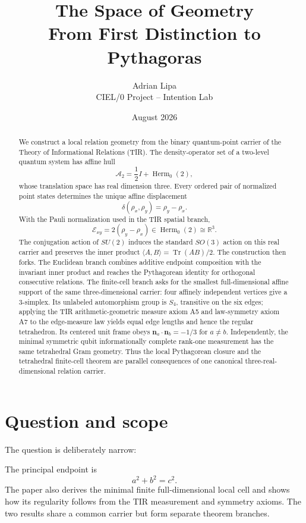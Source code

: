 \documentclass[12pt,a4paper]{article}
\title{\textbf{The Space of Geometry}\\[0.4em]\large From First Distinction to Pythagoras}
\author{Adrian Lipa\\\small CIEL/0 Project -- Intention Lab}
\date{August 2026}
\newcommand{\Herm}{\operatorname{Herm}}
\newcommand{\Tr}{\operatorname{Tr}}
\newcommand{\R}{\mathbb{R}}
\newcommand{\Erel}{\mathcal{E}}
\newcommand{\Astate}{\mathcal{A}_2}
\newcommand{\nvec}{\bm{n}}
\begin{document}
\maketitle

\begin{abstract}
We construct a local relation geometry from the binary quantum-point carrier of the Theory of Informational Relations (TIR). The density-operator set of a two-level quantum system has affine hull
\[
\Astate=\frac12 I+\Herm_0(2),
\]
whose translation space has real dimension three. Every ordered pair of normalized point states determines the unique affine displacement
\[
\delta(\rho_x,\rho_y)=\rho_y-\rho_x.
\]
With the Pauli normalization used in the TIR spatial branch,
\[
\Erel_{xy}=2(\rho_y-\rho_x)\in\Herm_0(2)\cong\R^3.
\]
The conjugation action of $SU(2)$ induces the standard $SO(3)$ action on this real carrier and preserves the inner product $\langle A,B\rangle=\Tr(AB)/2$. The construction then forks. The Euclidean branch combines additive endpoint composition with the invariant inner product and reaches the Pythagorean identity for orthogonal consecutive relations. The finite-cell branch asks for the smallest full-dimensional affine support of the same three-dimensional carrier: four affinely independent vertices give a $3$-simplex. Its unlabeled automorphism group is $S_4$, transitive on the six edges; applying the TIR arithmetic-geometric measure axiom A5 and law-symmetry axiom A7 to the edge-measure law yields equal edge lengths and hence the regular tetrahedron. Its centered unit frame obeys $\nvec_a\cdot\nvec_b=-1/3$ for $a\neq b$. Independently, the minimal symmetric qubit informationally complete rank-one measurement has the same tetrahedral Gram geometry. Thus the local Pythagorean closure and the tetrahedral finite-cell theorem are parallel consequences of one canonical three-real-dimensional relation carrier.
\end{abstract}

\section{Question and scope}

The question is deliberately narrow:
\begin{center}
\end{center}
The principal endpoint is
\[
\boxed{a^2+b^2=c^2.}
\]
The paper also derives the minimal finite full-dimensional local cell and shows how its regularity follows from the TIR measurement and symmetry axioms. The two results share a common carrier but form separate theorem branches.
\end{document}
